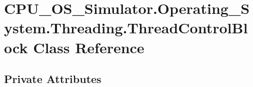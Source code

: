 \hypertarget{class_c_p_u___o_s___simulator_1_1_operating___system_1_1_threading_1_1_thread_control_block}{}\section{C\+P\+U\+\_\+\+O\+S\+\_\+\+Simulator.\+Operating\+\_\+\+System.\+Threading.\+Thread\+Control\+Block Class Reference}
\label{class_c_p_u___o_s___simulator_1_1_operating___system_1_1_threading_1_1_thread_control_block}
\subsection*{Private Attributes}
